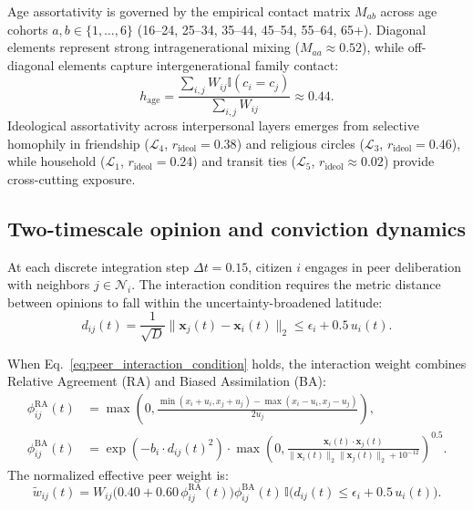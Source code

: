 \documentclass[11pt,a4paper]{article}
\begin{document}
Age assortativity is governed by the empirical contact matrix $M_{ab}$ across age cohorts $a, b \in \{1, \dots, 6\}$ (16--24, 25--34, 35--44, 45--54, 55--64, 65+). Diagonal elements represent strong intragenerational mixing ($M_{aa} \approx 0.52$), while off-diagonal elements capture intergenerational family contact:
\begin{equation}
    h_{\mathrm{age}} = \frac{\sum_{i,j} W_{ij} \mathbb{I}(c_i = c_j)}{\sum_{i,j} W_{ij}} \approx 0.44.
    \label{eq:age_homophily_metric}
\end{equation}
Ideological assortativity across interpersonal layers emerges from selective homophily in friendship ($\mathcal{L}_4$, $r_{\mathrm{ideol}} = 0.38$) and religious circles ($\mathcal{L}_3$, $r_{\mathrm{ideol}} = 0.46$), while household ($\mathcal{L}_1$, $r_{\mathrm{ideol}} = 0.24$) and transit ties ($\mathcal{L}_5$, $r_{\mathrm{ideol}} \approx 0.02$) provide cross-cutting exposure.

\subsection{Two-timescale opinion and conviction dynamics}
\label{sssec:two_timescale_derivations}
At each discrete integration step $\Delta t = 0.15$, citizen $i$ engages in peer deliberation with neighbors $j \in \mathcal{N}_i$. The interaction condition requires the metric distance between opinions to fall within the uncertainty-broadened latitude:
\begin{equation}
    d_{ij}(t) = \frac{1}{\sqrt{D}}\|\mathbf{x}_j(t) - \mathbf{x}_i(t)\|_2 \le \epsilon_i + 0.5\,u_i(t).
    \label{eq:peer_interaction_condition}
\end{equation}

When Eq.~\eqref{eq:peer_interaction_condition} holds, the interaction weight combines Relative Agreement (RA) and Biased Assimilation (BA):
\begin{align}
    \phi_{ij}^{\mathrm{RA}}(t) &= \max\!\left(0, \frac{\min(x_i + u_i, x_j + u_j) - \max(x_i - u_i, x_j - u_j)}{2 u_j}\right), \label{eq:ra_overlap} \\
    \phi_{ij}^{\mathrm{BA}}(t) &= \exp\!\left(-b_i \cdot d_{ij}(t)^2\right) \cdot \max\!\left(0, \frac{\mathbf{x}_i(t) \cdot \mathbf{x}_j(t)}{\|\mathbf{x}_i(t)\|_2 \|\mathbf{x}_j(t)\|_2 + 10^{-12}}\right)^{0.5}. \label{eq:ba_cosine}
\end{align}
The normalized effective peer weight is:
\begin{equation}
    \tilde{w}_{ij}(t) = W_{ij} \big(0.40 + 0.60\,\phi_{ij}^{\mathrm{RA}}(t)\big) \phi_{ij}^{\mathrm{BA}}(t) \, \mathbb{I}\!\big(d_{ij}(t) \le \epsilon_i + 0.5\,u_i(t)\big).
    \label{eq:effective_peer_weight_full}
\end{equation}
\end{document}
